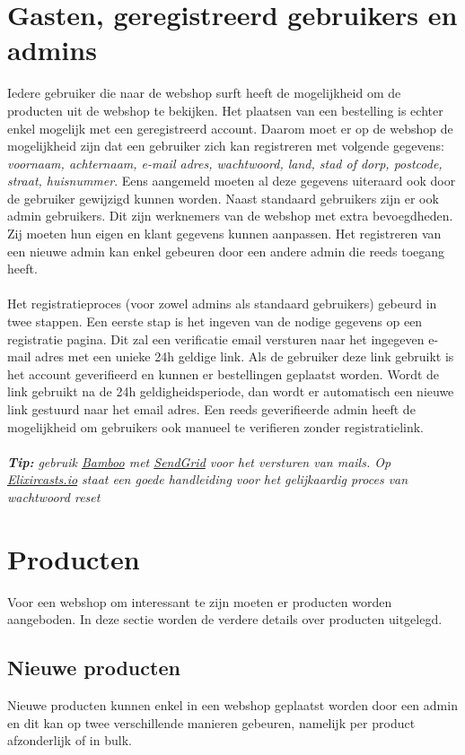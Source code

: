 \documentclass{article}
\begin{document}
\section{Gasten, geregistreerd gebruikers en admins}
Iedere gebruiker die naar de webshop surft heeft de mogelijkheid om de producten uit de webshop te bekijken. Het plaatsen van een bestelling is echter enkel mogelijk met een geregistreerd account. Daarom moet er op de webshop de mogelijkheid zijn dat een gebruiker zich kan registreren met volgende gegevens: \textit{voornaam, achternaam, e-mail adres, wachtwoord, land, stad of dorp, postcode, straat, huisnummer}. Eens aangemeld moeten al deze gegevens uiteraard ook door de gebruiker gewijzigd kunnen worden. Naast standaard gebruikers zijn er ook admin gebruikers. Dit zijn werknemers van de webshop met extra bevoegdheden. Zij moeten hun eigen en klant gegevens kunnen aanpassen. Het registreren van een nieuwe admin kan enkel gebeuren door een andere admin die reeds toegang heeft. 
\\ 
\\
Het registratieproces (voor zowel admins als standaard gebruikers) gebeurd in twee stappen. Een eerste stap is het ingeven van de nodige gegevens op een registratie pagina. Dit zal een verificatie email versturen naar het ingegeven e-mail adres met een unieke 24h geldige link. Als de gebruiker deze link gebruikt is het account geverifieerd en kunnen er bestellingen geplaatst worden. Wordt de link gebruikt na de 24h geldigheidsperiode, dan wordt er automatisch een nieuwe link gestuurd naar het email adres. Een reeds geverifieerde admin heeft de mogelijkheid om gebruikers ook manueel te verifieren zonder registratielink.
\\
\\
\textit{\textbf{Tip:} gebruik \href{https://hexdocs.pm/bamboo/1.1.0/readme.html}{Bamboo}  met \href{https://sendgrid.com}{SendGrid} voor het versturen van mails. Op \href{https://elixircasts.io/password-reset}{Elixircasts.io} staat een goede handleiding voor het gelijkaardig proces van wachtwoord reset}

\section{Producten}
Voor een webshop om interessant te zijn moeten er producten worden aangeboden. In deze sectie worden de verdere details over producten uitgelegd.

\subsection{Nieuwe producten}
Nieuwe producten kunnen enkel in een webshop geplaatst worden door een admin en dit kan op twee verschillende manieren gebeuren, namelijk per product afzonderlijk of in bulk.
\end{document}
